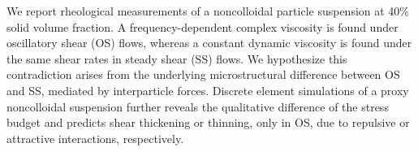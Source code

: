 \begin{paper}

\makepapertitle

%
\begin{paperabstract}
	We report rheological measurements of a noncolloidal particle suspension at 40\% solid volume fraction. A frequency-dependent complex viscosity is found under oscillatory shear (OS) flows, whereas a constant dynamic viscosity is found under the same shear rates in steady shear (SS) flows. We hypothesize this contradiction arises from the underlying microstructural difference between OS and SS, mediated by interparticle forces. Discrete element simulations of a proxy noncolloidal suspension further reveals the qualitative difference of the stress budget and predicts shear thickening or thinning, only in OS, due to repulsive or attractive interactions, respectively.
\end{paperabstract}


%



%


%


\end{paper}
